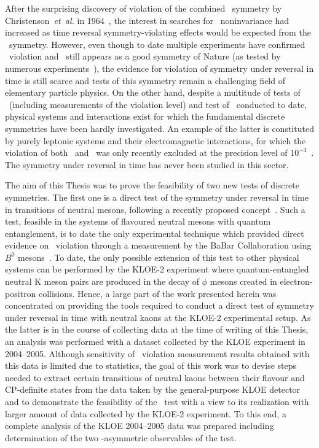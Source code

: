 After the surprising discovery of violation of the combined \CPs~symmetry by Christenson~\textit{et~al.} in 1964~\cite{cp_violation}, the interest in searches for \Ts~noninvariance had increased as time reversal symmetry-violating effects would be expected from the \CPTs~symmetry. However, even though to date multiple experiments have confirmed \CPs~violation and \CPTs~still appears as a good symmetry of Nature (as tested by numerous experiments~\cite{pdg2016}), the evidence for violation of symmetry under reversal in time is still scarce and tests of this symmetry remain a challenging field of elementary particle physics. On the other hand, despite a multitude of tests of \CPs~(including measurements of the violation level) and test of \CPTs~conducted to date, physical systems and interactions exist for which the fundamental discrete symmetries have been hardly investigated. An example of the latter is constituted by purely leptonic systems and their electromagnetic interactions, for which the violation of both \CPs~and \CPTs~was only recently excluded at the precision level of $10^{-3}$~\cite{cpt_positronium, cp_positronium}. The symmetry under reversal in time has never been studied in this sector.

The aim of this Thesis was to prove the feasibility of two new tests of discrete symmetries. The first one is a direct test of the symmetry under reversal in time in transitions of neutral mesons, following a recently proposed concept~\cite{theory-babar,theory:bernabeu-t}. Such a test, feasible in the systems of flavoured neutral mesons with quantum entanglement, is to date the only experimental technique which provided direct evidence on \Ts~violation through a measurement by the BaBar Collaboration using $B^0$ mesons~\cite{t_violation_babar}. To date, the only possible extension of this test to other physical systems can be performed by the KLOE-2 experiment where quantum-entangled neutral K meson pairs are produced in the decay of $\phi$ mesons created in electron-positron collisions. Hence, a large part of the work presented herein was concentrated on providing the tools required to conduct a direct test of symmetry under reversal in time with neutral kaons at the KLOE-2 experimental setup.
As the latter is in the course of collecting data at the time of writing of this Thesis, an analysis was performed with a dataset collected by the KLOE experiment in 2004--2005. Although sensitivity of \Ts~violation measurement results obtained with this data is limited due to statistics, the goal of this work was to devise steps needed to extract certain transitions of neutral kaons between their flavour and CP-definite states from the data taken by the general-purpose KLOE detector and to demonstrate the feasibility of the \Ts~test with a view to its realization with larger amount of data collected by the KLOE-2 experiment. To this end, a complete analysis of the KLOE 2004--2005 data was prepared including determination of the two \Ts-asymmetric observables of the test.

